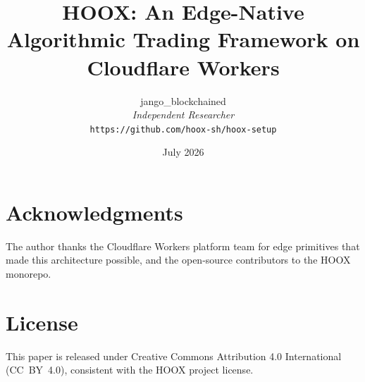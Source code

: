 \documentclass[10pt,a4paper]{article}
\title{\textbf{HOOX: An Edge-Native Algorithmic Trading Framework on Cloudflare Workers}}
\author{
  jango\_blockchained \\
  \small\textit{Independent Researcher} \\
  \small\texttt{https://github.com/hoox-sh/hoox-setup}
}
\date{July 2026}
\begin{document}
\maketitle














\section*{Acknowledgments}

The author thanks the Cloudflare Workers platform team for edge primitives that made this architecture possible, and the open-source contributors to the \textsc{HOOX} monorepo.

\section*{License}

This paper is released under Creative Commons Attribution 4.0 International (CC~BY~4.0), consistent with the \textsc{HOOX} project license.




\appendix




\end{document}
